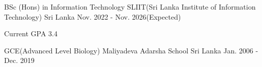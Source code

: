 

\begin{cventries}

  \cventry
    {BSc (Hons) in Information Technology} %
    {SLIIT(Sri Lanka Institute of Information Technology)} %
    {Sri Lanka} %
    {Nov. 2022 - Nov. 2026(Expected)} %
    {
      \begin{cvitems} %
        \item {Current GPA 3.4}
      \end{cvitems}
    }

  \cventry
    {GCE(Advanced Level Biology)} %
    {Maliyadeva Adarsha School} %
    {Sri Lanka} %
    {Jan. 2006 - Dec. 2019} %
    {
    }

\end{cventries}
